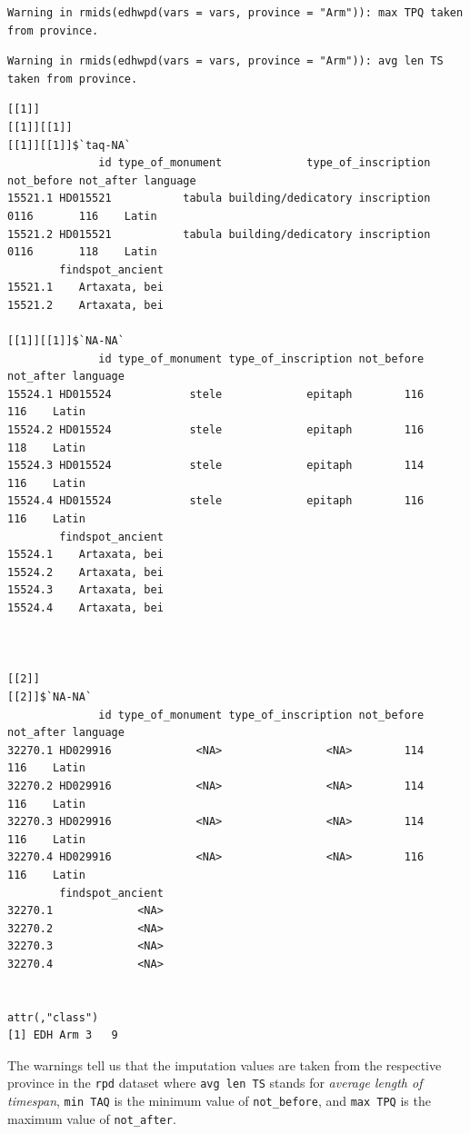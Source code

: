 \documentclass[a4paper,11pt]{memoir}
\begin{document}
\begin{verbatim}
Warning in rmids(edhwpd(vars = vars, province = "Arm")): max TPQ taken from province.
\end{verbatim}

\begin{verbatim}
Warning in rmids(edhwpd(vars = vars, province = "Arm")): avg len TS taken from province.
\end{verbatim}

\begin{verbatim}
[[1]]
[[1]][[1]]
[[1]][[1]]$`taq-NA`
              id type_of_monument             type_of_inscription not_before not_after language
15521.1 HD015521           tabula building/dedicatory inscription       0116       116    Latin
15521.2 HD015521           tabula building/dedicatory inscription       0116       118    Latin
        findspot_ancient
15521.1    Artaxata, bei
15521.2    Artaxata, bei

[[1]][[1]]$`NA-NA`
              id type_of_monument type_of_inscription not_before not_after language
15524.1 HD015524            stele             epitaph        116       116    Latin
15524.2 HD015524            stele             epitaph        116       118    Latin
15524.3 HD015524            stele             epitaph        114       116    Latin
15524.4 HD015524            stele             epitaph        116       116    Latin
        findspot_ancient
15524.1    Artaxata, bei
15524.2    Artaxata, bei
15524.3    Artaxata, bei
15524.4    Artaxata, bei



[[2]]
[[2]]$`NA-NA`
              id type_of_monument type_of_inscription not_before not_after language
32270.1 HD029916             <NA>                <NA>        114       116    Latin
32270.2 HD029916             <NA>                <NA>        114       116    Latin
32270.3 HD029916             <NA>                <NA>        114       116    Latin
32270.4 HD029916             <NA>                <NA>        116       116    Latin
        findspot_ancient
32270.1             <NA>
32270.2             <NA>
32270.3             <NA>
32270.4             <NA>


attr(,"class")
[1] EDH Arm 3   9  
\end{verbatim}

The warnings tell us that the imputation values are taken from the
respective province in the \texttt{rpd} dataset where
\texttt{avg\ len\ TS} stands for \emph{average length of timespan},
\texttt{min\ TAQ} is the minimum value of \texttt{not\_before}, and
\texttt{max\ TPQ} is the maximum value of \texttt{not\_after}.
\end{document}
